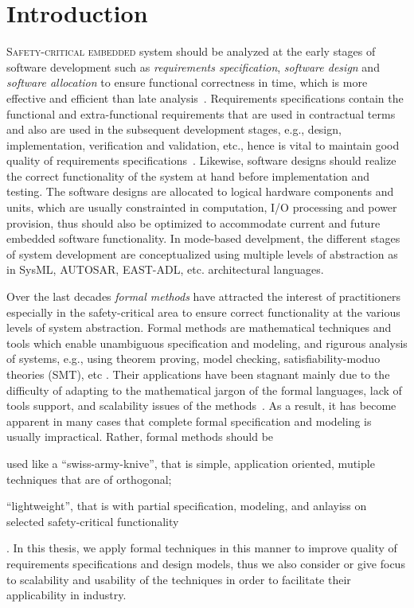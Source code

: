 \chapter{Introduction}\label{chapter_introduction}
\lettrine{S}{afety-critical embedded} system should be analyzed at the early stages of software development such as \emph{requirements specification}, \emph{software design} and \emph{software allocation} to ensure functional correctness in time, which is more effective and efficient than late analysis~\cite{bohm}.  Requirements specifications contain the functional and extra-functional requirements that are used in contractual terms and also are used in the subsequent development stages, e.g., design, implementation, verification and validation, etc., hence is vital to maintain good quality of requirements specifications~\cite{ieereqspecstandard}\cite{Siqueira2018ComparingReplication}. Likewise, software designs should realize the correct functionality of the system at hand before implementation and testing. The software designs are allocated to logical hardware components and units, which are usually constrainted in computation, I/O processing and power provision, thus should also be optimized to accommodate current and future embedded software functionality. In mode-based develpment, the different stages of system development are conceptualized using multiple levels of abstraction as in SysML, AUTOSAR, EAST-ADL, etc. architectural languages. 

Over the last decades \emph{formal methods} have attracted the interest of practitioners especially in the safety-critical area to ensure correct functionality at the various levels of system abstraction. Formal methods are mathematical techniques and tools which enable unambiguous specification and modeling, and rigurous analysis of systems, e.g., using theorem proving, model checking, satisfiability-moduo theories (SMT), etc \cite{o2017concise}.  Their applications have been stagnant mainly due to the difficulty of adapting to the mathematical jargon of the formal languages, lack of tools support, and scalability issues of the methods~\cite{Abrial2006FormalFuture}. As a result, it has become apparent in many cases that complete formal specification and modeling is usually impractical. Rather, formal methods should be
\begin{enumerate*}[label=(\roman*)]
	\item used like a ``swiss-army-knive'', that is simple, application oriented, mutiple techniques that are of orthogonal;
	\item ``lightweight'', that is with partial specification, modeling, and anlayiss on selected safety-critical functionality
\end{enumerate*}  \cite{lightweigh2001}.
In this thesis, we apply formal techniques in this manner to improve quality of requirements specifications and design models, thus we also consider or give focus to scalability and usability of the techniques in order to facilitate their applicability in industry.


